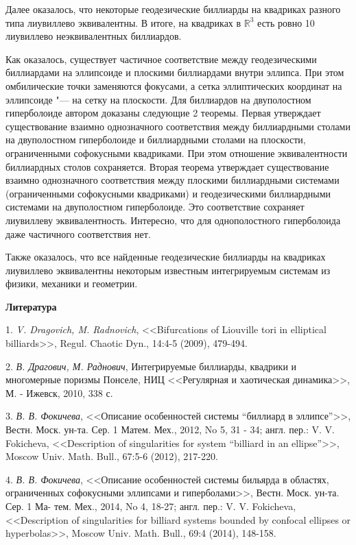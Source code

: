 Далее оказалось, что некоторые геодезические биллиарды на квадриках разного типа лиувиллево эквивалентны.
В итоге, на квадриках в $\mathbb{R}^3$ есть ровно 10 лиувиллево неэквивалентных биллиардов.



Как оказалось, существует частичное соответствие между геодезическими биллиардами на эллипсоиде и плоскими биллиардами
внутри эллипса. При этом омбилические точки заменяются фокусами, а сетка эллиптических координат на
эллипсоиде "--- на сетку на плоскости. Для биллиардов на двуполостном гиперболоиде
автором доказаны следующие 2 теоремы. Первая утверждает существование взаимно однозначного соответствия между
биллиардными столами на двуполостном гиперболоиде и биллиардными столами на плоскости, ограниченными софокусными квадриками. При этом
отношение эквивалентности биллиардных столов сохраняется. Вторая теорема утверждает существование
взаимно однозначного соответствия между плоскими биллиардными системами (ограниченными софокусными квадриками) и геодезическими биллиардными
системами на
двуполостном гиперболоиде. Это соответствие сохраняет лиувиллеву эквивалентность.
Интересно, что для однополостного гиперболоида даже частичного соответствия нет.

Также оказалось, что все найденные геодезические биллиарды на квадриках лиувиллево эквивалентны некоторым известным
интегрируемым системам из физики, механики и геометрии.


\smallskip \centerline {\bf Литература} \nopagebreak


1. {\it V. Dragovich, M. Radnovich}, <<Bifurcations of Liouville tori in elliptical billiards>>, Regul.
Chaotic Dyn., 14:4-5 (2009), 479-494.

2. {\it В. Драгович, М. Раднович}, Интегрируемые биллиарды, квадрики и многомерные
поризмы Понселе, НИЦ <<Регулярная и хаотическая динамика>>, М. - Ижевск, 2010,
338 с.

3. {\it В. В. Фокичева}, <<Описание особенностей системы ``биллиард в эллипсе''>>, Вестн.
Моск. ун-та. Сер. 1 Матем. Мех., 2012, No 5, 31 - 34; англ. пер.: V. V. Fokicheva,
<<Description of singularities for system ``billiard in an ellipse''>>, Moscow Univ. Math.
Bull., 67:5-6 (2012), 217-220.

4. {\it В. В. Фокичева}, <<Описание особенностей системы бильярда в областях, ограниченных
софокусными эллипсами и гиперболами>>, Вестн. Моск. ун-та. Сер. 1 Ма-
тем. Мех., 2014, No 4, 18-27; англ. пер.: V. V. Fokicheva, <<Description of singularities
for billiard systems bounded by confocal ellipses or hyperbolas>>, Moscow Univ. Math.
Bull., 69:4 (2014), 148-158.
